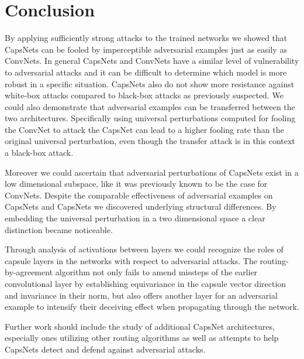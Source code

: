 
\section{Conclusion}
\label{sec:conclusion}

By applying sufficiently strong attacks to the trained networks we showed that CapsNets can be fooled by imperceptible adversarial examples just as easily as ConvNets. In general CapsNets and ConvNets have a similar level of vulnerability to adversarial attacks and it can be difficult to determine which model is more robust in a specific situation.
CapsNets also do not show more resistance against white-box attacks compared to black-box attacks as previously suspected.
We could also demonstrate that adversarial examples can be transferred between the two architectures.
Specifically using universal perturbations computed for fooling the ConvNet to attack the CapsNet can lead to a higher fooling rate than the original universal perturbation, even though the transfer attack is in this context a black-box attack.

Moreover we could ascertain that adversarial perturbations of CapsNets exist in a low dimensional subspace, like it was previously known to be the case for ConvNets.
Despite the comparable effectiveness of adversarial examples on CapsNets and CapsNets we discovered underlying structural differences.
By embedding the universal perturbation in a two dimensional space a clear distinction became noticeable.

Through analysis of activations between layers we could recognize the roles of capsule layers in the networks with respect to adversarial attacks. The routing-by-agreement algorithm not only fails to amend missteps of the earlier convolutional layer by establishing equivariance in the capsule vector direction and invariance in their norm, but also offers another layer for an adversarial example to intensify their deceiving effect when propagating through the network.

Further work should include the study of additional CapsNet architectures, especially ones utilizing other routing algorithms as well as attempts to help CapsNets detect and defend against adversarial attacks.